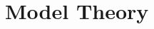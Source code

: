 \documentclass[open-logic-chapter]{subfiles}
\begin{document}
\chapter{Model Theory}








\end{document}

